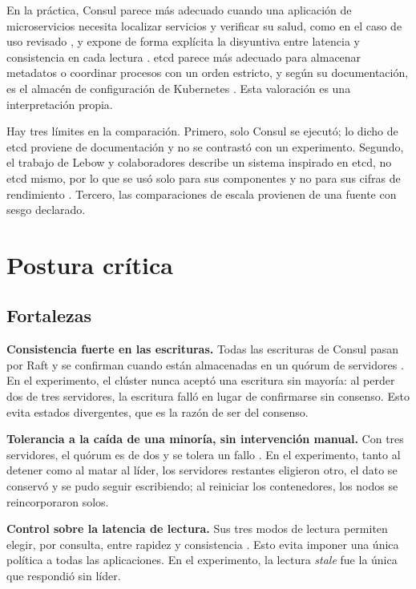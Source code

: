 \documentclass[12pt,a4paper]{article}
\begin{document}
En la práctica, Consul parece más adecuado cuando una aplicación de microservicios necesita
localizar servicios y verificar su salud, como en el caso de uso revisado
\cite{rodrigues2025stress}, y expone de forma explícita la disyuntiva entre latencia y
consistencia en cada lectura \cite{consul_consensus}. etcd parece más adecuado para almacenar
metadatos o coordinar procesos con un orden estricto, y según su documentación, es el almacén
de configuración de Kubernetes \cite{etcd_why}. Esta valoración es una interpretación propia.

Hay tres límites en la comparación. Primero, solo Consul se ejecutó; lo dicho de etcd proviene
de documentación y no se contrastó con un experimento. Segundo, el trabajo de Lebow y
colaboradores describe un sistema inspirado en etcd, no etcd mismo, por lo que se usó solo para
sus componentes y no para sus cifras de rendimiento \cite{lebow2025smr}. Tercero, las
comparaciones de escala provienen de una fuente con sesgo declarado.

\section{Postura crítica}

\subsection{Fortalezas}

\textbf{Consistencia fuerte en las escrituras.} Todas las escrituras de Consul pasan por Raft y
se confirman cuando están almacenadas en un quórum de servidores \cite{consul_consensus}. En el
experimento, el clúster nunca aceptó una escritura sin mayoría: al perder dos de tres
servidores, la escritura falló en lugar de confirmarse sin consenso. Esto evita estados
divergentes, que es la razón de ser del consenso.

\textbf{Tolerancia a la caída de una minoría, sin intervención manual.} Con tres servidores, el
quórum es de dos y se tolera un fallo \cite{consul_consensus}. En el experimento, tanto al
detener como al matar al líder, los servidores restantes eligieron otro, el dato se conservó y
se pudo seguir escribiendo; al reiniciar los contenedores, los nodos se reincorporaron solos.

\textbf{Control sobre la latencia de lectura.} Sus tres modos de lectura permiten elegir, por
consulta, entre rapidez y consistencia \cite{consul_consensus}. Esto evita imponer una única
política a todas las aplicaciones. En el experimento, la lectura \textit{stale} fue la única
que respondió sin líder.
\end{document}
